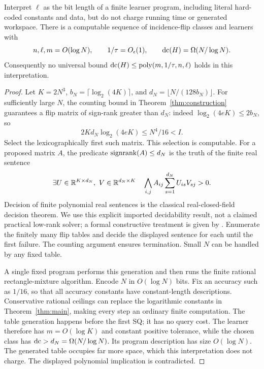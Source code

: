 \begin{samepage}
\begin{theorem}\label{thm:description}
Interpret $\ell$ as the bit length of a finite learner program, including literal hard-coded constants and data, but do not charge running time or generated workspace. There is a computable sequence of incidence-flip classes and learners with
\[
 n,\ell,m=O(\log N),\qquad 1/\tau=O_\epsilon(1),\qquad
 \operatorname{dc}(H)=\Omega(N/\log N).
\]
Consequently no universal bound $\operatorname{dc}(H)\le\operatorname{poly}(m,1/\tau,n,\ell)$ holds in this interpretation.
\end{theorem}
\end{samepage}
\begin{proof}
Let $K=2N^3$, $b_N=\lceil\log_2(4K)\rceil$, and $d_N=\lfloor N/(128b_N)\rfloor$. For sufficiently large $N$, the counting bound in Theorem~\ref{thm:construction} guarantees a flip matrix of sign-rank greater than $d_N$: indeed $\log_2(4eK)\le2b_N$, so
\[
 2Kd_N\log_2(4eK)\le N^4/16<I.
\]
Select the lexicographically first such matrix. This selection is computable. For a proposed matrix $A$, the predicate $\operatorname{signrank}(A)\le d_N$ is the truth of the finite real sentence
\[
 \exists U\in\mathbb R^{K\times d_N},\ V\in\mathbb R^{d_N\times K}\quad
 \bigwedge_{i,j} A_{ij}\sum_{s=1}^{d_N}U_{is}V_{sj}>0.
\]
Decision of finite polynomial real sentences is the classical real-closed-field decision theorem. We use this explicit imported decidability result, not a claimed practical low-rank solver; a formal constructive treatment is given by \citet{MC12}. Enumerate the finitely many flip tables and decide the displayed sentence for each until the first failure. The counting argument ensures termination. Small $N$ can be handled by any fixed table.

A single fixed program performs this generation and then runs the finite rational rectangle-mixture algorithm. Encode $N$ in $O(\log N)$ bits. Fix an accuracy such as $1/16$, so that all accuracy constants have constant-length descriptions. Conservative rational ceilings can replace the logarithmic constants in Theorem~\ref{thm:main}, making every step an ordinary finite computation. The table generation happens before the first SQ; it has no query cost. The learner therefore has $m=O(\log K)$ and constant positive tolerance, while the chosen class has $\operatorname{dc}>d_N=\Omega(N/\log N)$. Its program description has size $O(\log N)$. The generated table occupies far more space, which this interpretation does not charge. The displayed polynomial implication is contradicted.
\end{proof}

